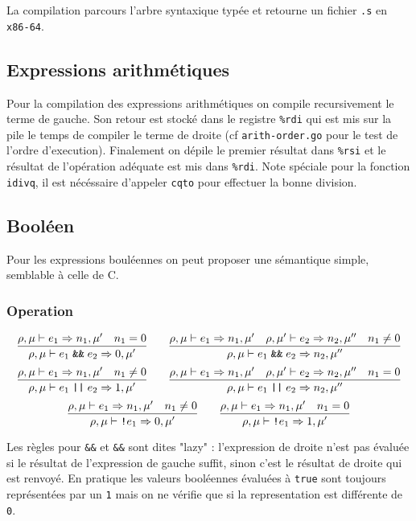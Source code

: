 \documentclass[11pt,a4paper]{article}
\begin{document}
La compilation parcours l'arbre syntaxique typée et retourne un fichier \verb|.s| en \verb|x86-64|.

\subsection{Expressions arithmétiques}

Pour la compilation des expressions arithmétiques on compile recursivement le terme de gauche. Son retour est stocké dans le registre \verb|%rdi| qui est mis sur la pile le temps de compiler le terme de droite (cf \verb|arith-order.go| pour le test de l'ordre d'execution). Finalement on dépile le premier résultat dans \verb|%rsi| et le résultat de l'opération adéquate est mis dans \verb|%rdi|.
Note spéciale pour la fonction \verb|idivq|, il est nécéssaire d'appeler \verb|cqto| pour effectuer la bonne division.

\subsection{Booléen}

Pour les expressions bouléennes on peut proposer une sémantique simple, semblable à celle de C.
\subsubsection{Operation}
\vspace{-2em}

$$\infer{\rho, \mu \vdash e_1 \; \text{\texttt{\&\&}} \; e_2 \Rightarrow 0, \mu '}{\rho, \mu \vdash e_1 \Rightarrow n_1, \mu ' & n_1 = 0}
\; \text{\; \; \;} \;
\infer{\rho, \mu \vdash e_1 \; \text{\texttt{\&\&}} \; e_2 \Rightarrow n_2, \mu ''}{\rho, \mu \vdash e_1 \Rightarrow n_1, \mu ' & \rho, \mu ' \vdash e_2 \Rightarrow n_2, \mu '' & n_1 \neq 0}$$
$$\infer{\rho, \mu \vdash e_1 \; \text{\texttt{||}} \; e_2 \Rightarrow 1, \mu '}{\rho, \mu \vdash e_1 \Rightarrow n_1, \mu ' & n_1 \neq 0}
\; \text{\; \; \;} \;
\infer{\rho, \mu \vdash e_1 \; \text{\texttt{||}} \; e_2 \Rightarrow n_2, \mu ''}{\rho, \mu \vdash e_1 \Rightarrow n_1, \mu ' & \rho, \mu ' \vdash e_2 \Rightarrow n_2, \mu '' & n_1 = 0}$$
$$\infer{\rho, \mu \vdash \text{\texttt{!}} e_1 \Rightarrow 0, \mu '}{\rho, \mu \vdash e_1 \Rightarrow n_1, \mu ' & n_1 \neq 0}
\; \text{\; \; \;} \;
\infer{\rho, \mu \vdash \text{\texttt{!}} e_1 \Rightarrow 1, \mu '}{\rho, \mu \vdash e_1 \Rightarrow n_1, \mu ' & n_1 = 0}$$

Les règles pour \verb-&&- et \verb-&&- sont dites "lazy" : l'expression de droite n'est pas évaluée si le résultat de l'expression de gauche suffit, sinon c'est le résultat de droite qui est renvoyé.
En pratique les valeurs booléennes évaluées à \verb|true| sont toujours représentées par un \verb|1| mais on ne vérifie que si la representation est différente de \verb|0|.
\end{document}
